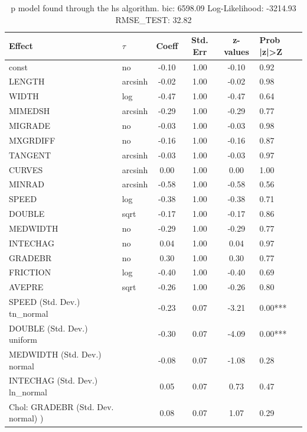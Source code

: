 \begin{table}
	\caption{p model found through the hs algorithm. bic: 6598.09 Log-Likelihood: -3214.93 RMSE_TEST: 32.82}
	\begin{center}
		\begin{tabular}{|l|l|c|c|c|l|}
			\hline
			Effect & $\tau$ & Coeff & Std. Err & z-values & Prob |z|>Z \\
			\hline
			const & no & -0.10 & 1.00 & -0.10 & 0.92 \\
			\hline
			LENGTH & arcsinh & -0.02 & 1.00 & -0.02 & 0.98 \\
			\hline
			WIDTH & log & -0.47 & 1.00 & -0.47 & 0.64 \\
			\hline
			MIMEDSH & arcsinh & -0.29 & 1.00 & -0.29 & 0.77 \\
			\hline
			MIGRADE & no & -0.03 & 1.00 & -0.03 & 0.98 \\
			\hline
			MXGRDIFF & no & -0.16 & 1.00 & -0.16 & 0.87 \\
			\hline
			TANGENT & arcsinh & -0.03 & 1.00 & -0.03 & 0.97 \\
			\hline
			CURVES & arcsinh & 0.00 & 1.00 & 0.00 & 1.00 \\
			\hline
			MINRAD & arcsinh & -0.58 & 1.00 & -0.58 & 0.56 \\
			\hline
			SPEED & log & -0.38 & 1.00 & -0.38 & 0.71 \\
			\hline
			DOUBLE & sqrt & -0.17 & 1.00 & -0.17 & 0.86 \\
			\hline
			MEDWIDTH & no & -0.29 & 1.00 & -0.29 & 0.77 \\
			\hline
			INTECHAG & no & 0.04 & 1.00 & 0.04 & 0.97 \\
			\hline
			GRADEBR & no & 0.30 & 1.00 & 0.30 & 0.77 \\
			\hline
			FRICTION & log & -0.40 & 1.00 & -0.40 & 0.69 \\
			\hline
			AVEPRE & sqrt & -0.26 & 1.00 & -0.26 & 0.80 \\
			\hline
			SPEED (Std. Dev.) tn_normal &  & -0.23 & 0.07 & -3.21 & 0.00*** \\
			\hline
			DOUBLE (Std. Dev.) uniform &  & -0.30 & 0.07 & -4.09 & 0.00*** \\
			\hline
			MEDWIDTH (Std. Dev.) normal &  & -0.08 & 0.07 & -1.08 & 0.28 \\
			\hline
			INTECHAG (Std. Dev.) ln_normal &  & 0.05 & 0.07 & 0.73 & 0.47 \\
			\hline
			 Chol: GRADEBR (Std. Dev. normal) ) &  & 0.08 & 0.07 & 1.07 & 0.29 \\

\end{tabular}
\end{center}
\end{table}
